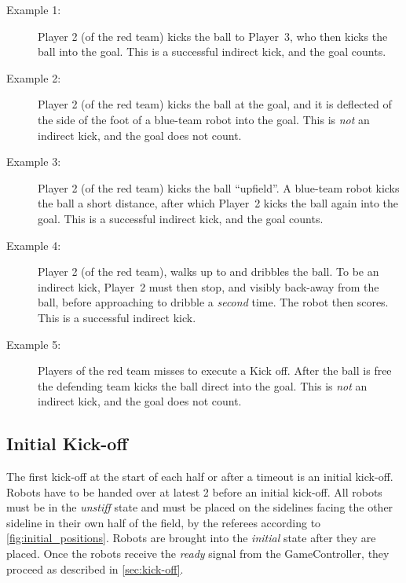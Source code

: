 \begin{description}
  \item[Example 1:] Player 2 (of the red team) kicks the ball to Player~3, who then kicks the ball into the goal. This is a successful indirect kick, and the goal counts.
  \item[Example 2:] Player 2 (of the red team) kicks the ball at the goal, and it is deflected of the side of the foot of a blue-team robot into the goal. This is \textit{not} an indirect kick, and the goal does not count.
  \item[Example 3:] Player 2 (of the red team) kicks the ball ``upfield''. A blue-team robot kicks the ball a short distance, after which Player~2 kicks the ball again into the goal. This is a successful indirect kick, and the goal counts.
  \item[Example 4:] Player 2 (of the red team), walks up to and dribbles the ball. To be an indirect kick, Player~2 must then stop, and visibly back-away from the ball, before approaching to dribble a \textit{second} time. The robot then scores. This is a successful indirect kick.
  \item[Example 5:] Players of the red team misses to execute a Kick off. After the ball is free the defending team kicks the ball direct into the goal. This is \textit{not} an indirect kick, and the goal does not count.
\end{description}

\subsection{Initial Kick-off}
\label{sec:initial-kick-off}

The first kick-off at the start of each half or after a timeout is an initial kick-off.
Robots have to be handed over at latest \qty{2}{\min} before an initial kick-off. All robots must be in the \textit{unstiff} state and must be placed on the sidelines facing the other sideline in their own half of the field, by the referees according to \cref{fig:initial_positions}. Robots are brought into the \textit{initial} state after they are placed. Once the robots receive the \emph{ready} signal from the GameController, they proceed as described in \cref{sec:kick-off}.

